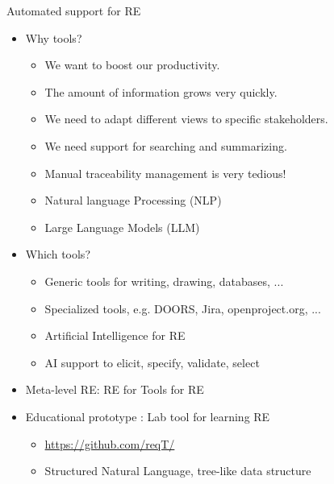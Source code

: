 \begin{Slide}{Automated support for RE}

\begin{itemize}
\item Why tools?
\begin{itemize}
\item We want to boost our productivity.
\item The amount of information grows very quickly.
\item We need to adapt different views to specific stakeholders.
\item We need support for searching and summarizing.
\item Manual traceability management is very tedious!
\item Natural language Processing (NLP) 
\item Large Language Models (LLM)
\end{itemize}
\item  Which tools?
\begin{itemize}
\item Generic tools for writing, drawing, databases, ...
\item Specialized tools, e.g. DOORS, Jira, openproject.org, ...
\item Artificial Intelligence for RE
\item AI support to elicit, specify, validate, select

\end{itemize}
\item Meta-level RE: RE for Tools for RE

\item Educational prototype : Lab tool for learning RE
\begin{itemize}
\item \url{https://github.com/reqT/}
\item Structured Natural Language, tree-like data structure

\end{itemize}
\end{itemize}
\end{Slide}